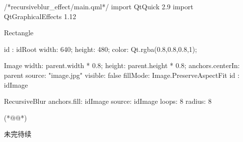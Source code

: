 \label{f000069}    %
\FloatBarrier                                  %
\begin{thebookfilesourceone}[escapeinside={(*@}{@*)},
caption=GoodLuck,
title=\filesourcenumbernameone \thefilesourcenumber
]
/*recursiveblur_effect/main.qml*/
import QtQuick 2.9
import QtGraphicalEffects 1.12

Rectangle {
    id : idRoot
    width: 640;
    height: 480;
    color: Qt.rgba(0.8,0.8,0.8,1);

    Image{
        width: parent.width * 0.8;
        height: parent.height * 0.8;
        anchors.centerIn: parent
        source: "image.jpg"
        visible: false
        fillMode: Image.PreserveAspectFit
        id : idImage
    }

    RecursiveBlur{
        anchors.fill: idImage
        source: idImage
        loops: 8
        radius: 8
    }
}(*@\marginpar[\hfill\setlength\fboxsep{2pt}\fbox{\footnotesize{\kaishu\parbox{1em}{\setlength{\baselineskip}{2pt}\filesourcenumbernameone}}\footnotesize{\thefilesourcenumber}}]{\setlength\fboxsep{2pt}\fbox{\footnotesize{\kaishu\parbox{1em}{\setlength{\baselineskip}{2pt}\filesourcenumbernameone}}\footnotesize{\thefilesourcenumber}}}@*)\end{thebookfilesourceone}          %
\addtocounter{lstlisting}{-1}   %


未完待续









